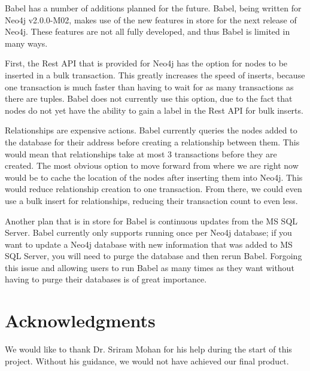\documentclass{acm_proc_article-sp}
\begin{document}
Babel has a number of additions planned for the future. Babel, being written for Neo4j v2.0.0-M02, makes use of the new features in store for the next release of Neo4j. These features are not all fully developed, and thus Babel is limited in many ways.

First, the Rest API that is provided for Neo4j has the option for nodes to be inserted in a bulk transaction. This greatly increases the speed of inserts, because one transaction is much faster than having to wait for as many transactions as there are tuples. Babel does not currently use this option, due to the fact that nodes do not yet have the ability to gain a label in the Rest API for bulk inserts.

Relationships are expensive actions. Babel currently queries the nodes added to the database for their address before creating a relationship between them. This would mean that relationships take at most 3 transactions before they are created. The most obvious option to move forward from where we are right now would be to cache the location of the nodes after inserting them into Neo4j. This would reduce relationship creation to one transaction. From there, we could even use a bulk insert for relationships, reducing their transaction count to even less.

Another plan that is in store for Babel is continuous updates from the MS SQL Server. Babel currently only supports running once per Neo4j database; if you want to update a Neo4j database with new information that was added to MS SQL Server, you will need to purge the database and then rerun Babel. Forgoing this issue and allowing users to run Babel as many times as they want without having to purge their databases is of great importance.

\section{Acknowledgments}

We would like to thank Dr. Sriram Mohan for his help during the start of this project. Without his guidance, we would not have achieved our final product.

%

%
\end{document}
